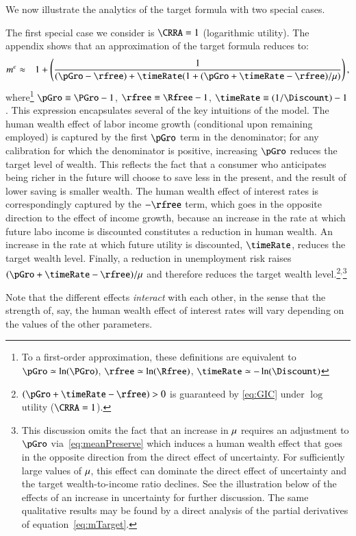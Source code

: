 \documentclass[titlepage,abstract]{\econtex}\newcommand{\texname}{ctDiscrete}
\begin{document}
We now illustrate the analytics of the target formula with two special cases.

The first special case we consider is $\CRRA = 1$ (logarithmic utility). The appendix shows that an approximation of the target formula reduces to:
\begin{eqnarray}
  \mTarg^{e} 
  & \approx & 
  1 + \left(\frac{1}{(\pGro-\rfree)+\timeRate(1+(\pGro+\timeRate-\rfree)/\urate)}\right) 
\label{eq:mTargetLogCase}
,
\end{eqnarray}
where\footnote{To a first-order approximation, these definitions are equivalent to
  $\pGro\simeq\ln(\PGro)$,  
  $\rfree\simeq\ln(\Rfree)$, 
  $\timeRate\simeq-\ln(\Discount)$}
$\pGro\equiv\PGro-1$, 
$\rfree\equiv\Rfree-1$, 
$\timeRate\equiv(1/\Discount)-1$.
This expression encapsulates several of the key intuitions of the
model.  The human wealth effect of labor income growth (conditional upon remaining employed) is captured by the first $\pGro$ term in the denominator; for any calibration for which
the denominator is positive, increasing $\pGro$ reduces the target
level of wealth.  This reflects the fact that a consumer who
anticipates being richer in the future will choose to save less in the
present, and the result of lower saving is smaller wealth.  The human
wealth effect of interest rates is correspondingly captured by the
$-\rfree$ term, which goes in the opposite direction to the effect of
income growth, because an increase in the rate at which future labo
income is discounted constitutes a reduction in human wealth.  
An increase in the rate at which future utility is
discounted, $\timeRate$, reduces the target wealth level.  Finally, a
reduction in unemployment risk raises
$(\pGro+\timeRate-\rfree)/\urate$ and therefore reduces the target
wealth level.\footnote{$(\pGro+\timeRate-\rfree) > 0$ is guaranteed by
\eqref{eq:GIC} 
under $\log$ utility
($\CRRA=1$).}$^{,}$\footnote{This discussion omits the fact that an
  increase in $\mu$ requires an adjustment to $\pGro$
  via~\eqref{eq:meanPreserve} which induces a human wealth effect that
  goes in the opposite direction from the direct effect of
  uncertainty.  For sufficiently large values of $\mu$, this effect
  can dominate the direct effect of uncertainty and the target
  wealth-to-income ratio declines.  See the illustration below of the
  effects of an increase in uncertainty for further discussion. 
  The same qualitative results may be found by a direct analysis of 
  the partial derivatives of equation~\eqref{eq:mTarget}. }

Note that the different effects \textit{interact} with each other, in the
sense that the strength of, say, the human wealth effect of interest
rates will vary depending on the values of the other parameters.
\end{document}
